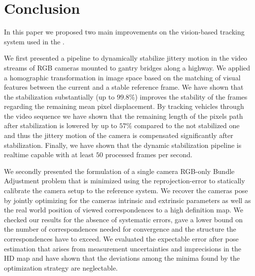 
\section{Conclusion}

In this paper we proposed two main improvements on the vision-based tracking system used in the \Providentia{}.

We first presented a pipeline to dynamically stabilize jittery motion in the video streams of RGB cameras mounted to gantry bridges along a highway.
We applied a homographic transformation in image space based on the matching of visual features between the current and a stable reference frame.
We have shown that the stabilization substantially (up to $99.8\%$) improves the stability of the frames regarding the remaining mean pixel displacement.
By tracking vehicles through the video sequence we have shown that the remaining length of the pixels path after stabilization is lowered by up to $57\%$ compared to the not stabilized one and thus the jittery motion of the camera is compensated significantly after stabilization.
Finally, we have shown that the dynamic stabilization pipeline is realtime capable with at least $50$ processed frames per second.

We secondly presented the formulation of a single camera RGB-only Bundle Adjustment problem that is minimized using the reprojection-error to statically calibrate the camera setup to the reference system.
We recover the cameras pose by jointly optimizing for the cameras intrinsic and extrinsic parameters as well as the real world position of viewed correspondences to a high definition map.
We checked our results for the absence of systematic errors, gave a lower bound on the number of correspondences needed for convergence and the structure the correspondences have to exceed.
We evaluated the expectable error after pose estimation that arises from measurement uncertainties and imprecisions in the HD map and have shown that the deviations among the minima found by the optimization strategy are neglectable.
